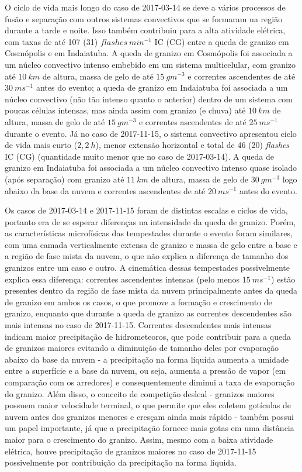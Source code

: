 O ciclo de vida mais longo do caso de 2017-03-14 se deve a vários processos de fusão e separação com outros sistemas convectivos que se formaram na região durante a tarde e noite. Isso também contribuiu para a alta atividade elétrica, com taxas de até 107 (31) $flashes\:min^{-1}$ IC (CG) entre a queda de granizo em Cosmópolis e em Indaiatuba. A queda de granizo em Cosmópolis foi associada a um núcleo convectivo intenso embebido em um sistema multicelular, com granizo até $10\:km$ de altura, massa de gelo de até $15\:gm^{-3}$ e correntes ascendentes de até $30\:ms^{-1}$ antes do evento; a queda de granizo em Indaiatuba foi associada a um núcleo convectivo (não tão intenso quanto o anterior) dentro de um sistema com poucas células intensas, mas ainda assim com granizo (e chuva) até $10\:km$ de altura, massa de gelo de até $15\:gm^{-3}$ e correntes ascendentes de até $25\:ms^{-1}$ durante o evento. Já no caso de 2017-11-15, o sistema convectivo apresentou ciclo de vida mais curto ($2,2\:h$), menor extensão horizontal e total de 46 (20) \textit{flashes} IC (CG) (quantidade muito menor que no caso de 2017-03-14). A queda de granizo em Indaiatuba foi associada a um núcleo convectivo intenso quase isolado (após separação) com granizo até $11\:km$ de altura, massa de gelo de $30\:gm^{-3}$ logo abaixo da base da nuvem e correntes ascendentes de até $20\:ms^{-1}$ antes do evento.

Os casos de 2017-03-14 e 2017-11-15 foram de distintas escalas e ciclos de vida, portanto era de se esperar diferenças na intensidade da queda de granizo. Porém, as características microfísicas das tempestades durante o evento foram similares, com uma camada verticalmente extensa de granizo e massa de gelo entre a base e a região de fase mista da nuvem, o que não explica a diferença de tamanho dos granizos entre um caso e outro. A cinemática dessas tempestades possivelmente explica essa diferença: correntes ascendentes intensas (pelo menos $15\:ms^{-1}$) estão presentes dentro da região de fase mista da nuvem principalmente antes da queda de granizo em ambos os casos, o que promove a formação e crescimento de granizo, enquanto que durante a queda de granizo as correntes descendentes são mais intensas no caso de 2017-11-15. Correntes descendentes mais intensas indicam maior precipitação de hidrometeoros, que pode contribuir para a queda de granizos maiores evitando a diminuição de tamanho deles por evaporação abaixo da base da nuvem - a precipitação na forma líquida aumenta a umidade entre a superfície e a base da nuvem, ou seja, aumenta a pressão de vapor (em comparação com os arredores) e consequentemente diminui a taxa de evaporação do granizo. Além disso, o conceito de competição desleal - granizos maiores possuem maior velocidade terminal, o que permite que eles coletem gotículas de nuvem antes dos granizos menores e cresçam ainda mais rápido \cite{Knight2001} - também possui um papel importante, já que a precipitação fornece mais gotas em uma distância maior para o crescimento do granizo. Assim, mesmo com a baixa atividade elétrica, houve precipitação de granizos maiores no caso de 2017-11-15 possivelmente por contribuição da precipitação na forma líquida.

